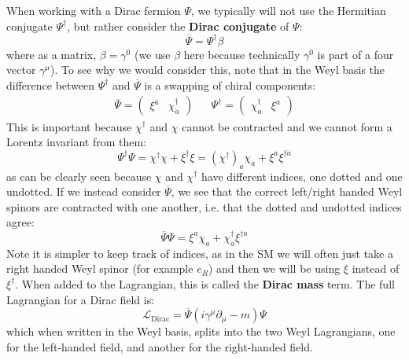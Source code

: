 \documentclass[11pt, oneside]{article}   	%
\theoremstyle{definition}
\begin{document}
When working with a Dirac fermion $\Psi$, we typically will not use the Hermitian 
conjugate $\Psi^\dagger$, but rather consider the \textbf{Dirac conjugate} of $\Psi$:
\begin{equation}
	\overline\Psi = \Psi^\dagger\beta
\end{equation}
where as a matrix, $\beta = \gamma^0$ (we use $\beta$ here because technically $\gamma^0$ is part of a four vector $\gamma^\mu$). To 
see why we would consider this, note that in the Weyl basis the difference between $\Psi^\dagger$ and $\overline\Psi$ is a swapping of chiral 
components:
\begin{align}
	\overline\Psi = \begin{pmatrix} \xi^a & \chi^{\dagger}_{\dot a} \end{pmatrix} && 
	\Psi^\dagger = \begin{pmatrix} \chi^\dagger_{\dot a} & \xi^a \end{pmatrix}
\end{align}
This is important because $\chi^\dagger$ and $\chi$ cannot be contracted and we cannot form a Lorentz invariant from them:
\begin{equation}
	\Psi^\dagger\Psi = \chi^\dagger\chi + \xi^\dagger\xi = (\chi^\dagger)_{\dot a}\chi_a + \xi^{a}\xi^{\dagger\dot a}
\end{equation}
as can be clearly seen because $\chi$ and $\chi^\dagger$ have different indices, one dotted and one undotted. If we instead consider 
$\overline\Psi$, we see that the correct left/right handed Weyl spinors are contracted with one another, i.e. that the dotted and undotted 
indices agree:
\begin{equation}
	\overline\Psi\Psi = \xi^a \chi_a + \chi^\dagger_{\dot a} \xi^{\dagger\dot a}
\end{equation}
Note it is simpler to keep track of indices, as in the SM we will often just take a right handed Weyl spinor (for example $e_R$) and then 
we will be using $\xi$ instead of $\xi^\dagger$. When added to the Lagrangian, this is called the \textbf{Dirac mass} term. 
The full Lagrangian for a Dirac field is:
\begin{equation}
	\mathcal{L}_\mathrm{Dirac} = \overline\Psi(i\gamma^\mu\partial_\mu - m)\Psi
\end{equation}
which when written in the Weyl basis, splits into the two Weyl Lagrangians, one for the left-handed field, and another for the right-handed field. 
\end{document}
